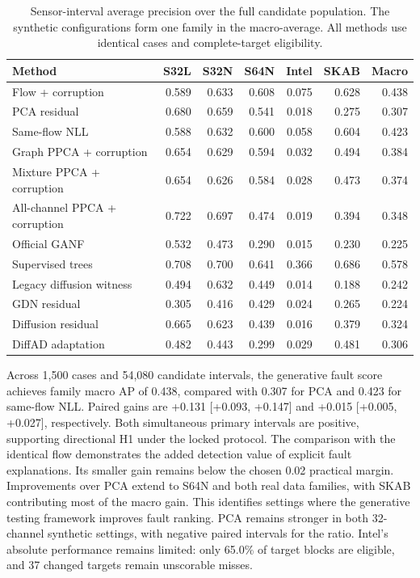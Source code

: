 \documentclass{llncs}
\newcommand{\1}{\mathbf{1}}
\begin{document}
\begin{table}[!tbp]
\centering
\caption{Sensor-interval average precision over the full candidate population. The synthetic configurations form one family in the macro-average. All methods use identical cases and complete-target eligibility.}
\label{tab:ap}
\small
\begin{tabular}{@{}p{43mm}rrrrrr@{}}
\toprule
Method & S32L & S32N & S64N & Intel & SKAB & Macro \\
\midrule
Flow + corruption & 0.589 & 0.633 & 0.608 & 0.075 & 0.628 & 0.438 \\
PCA residual & 0.680 & 0.659 & 0.541 & 0.018 & 0.275 & 0.307 \\
Same-flow NLL & 0.588 & 0.632 & 0.600 & 0.058 & 0.604 & 0.423 \\
Graph PPCA + corruption & 0.654 & 0.629 & 0.594 & 0.032 & 0.494 & 0.384 \\
Mixture PPCA + corruption & 0.654 & 0.626 & 0.584 & 0.028 & 0.473 & 0.374 \\
All-channel PPCA + corruption & 0.722 & 0.697 & 0.474 & 0.019 & 0.394 & 0.348 \\
Official GANF & 0.532 & 0.473 & 0.290 & 0.015 & 0.230 & 0.225 \\
Supervised trees & 0.708 & 0.700 & 0.641 & 0.366 & 0.686 & 0.578 \\
Legacy diffusion witness & 0.494 & 0.632 & 0.449 & 0.014 & 0.188 & 0.242 \\
GDN residual & 0.305 & 0.416 & 0.429 & 0.024 & 0.265 & 0.224 \\
Diffusion residual & 0.665 & 0.623 & 0.439 & 0.016 & 0.379 & 0.324 \\
DiffAD adaptation & 0.482 & 0.443 & 0.299 & 0.029 & 0.481 & 0.306 \\
\bottomrule
\end{tabular}
\end{table}
Across 1,500 cases and 54,080 candidate intervals, the generative fault score achieves family macro AP of 0.438, compared with 0.307 for PCA and 0.423 for same-flow NLL. Paired gains are +0.131 [+0.093, +0.147] and +0.015 [+0.005, +0.027], respectively. Both simultaneous primary intervals are positive, supporting directional H1 under the locked protocol. The comparison with the identical flow demonstrates the added detection value of explicit fault explanations. Its smaller gain remains below the chosen 0.02 practical margin.
Improvements over PCA extend to S64N and both real data families, with SKAB contributing most of the macro gain. This identifies settings where the generative testing framework improves fault ranking. PCA remains stronger in both 32-channel synthetic settings, with negative paired intervals for the ratio. Intel's absolute performance remains limited: only 65.0\% of target blocks are eligible, and 37 changed targets remain unscorable misses.
\end{document}
